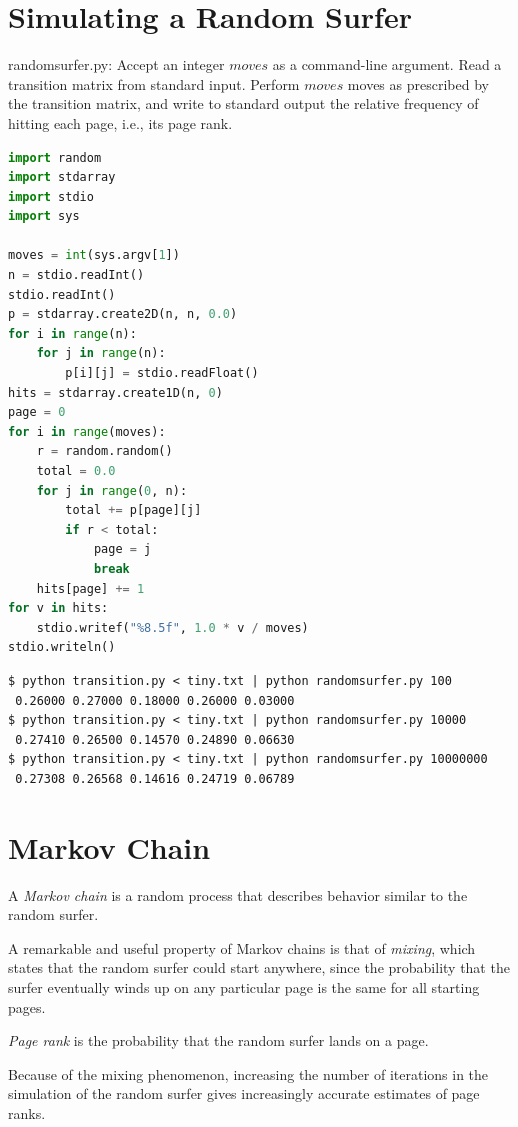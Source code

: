 \documentclass[8pt,a4paper,compress,handout]{beamer}
\begin{document}
\section{Simulating a Random Surfer}
\begin{frame}[fragile]
\begin{framed}
\tiny randomsurfer.py: Accept an integer $moves$ as a command-line argument. Read a transition matrix from standard input. Perform $moves$ moves as prescribed by the transition matrix, and write to standard output the relative frequency of hitting each page, i.e., its page rank.
\end{framed}

\begin{lstlisting}[language=Python]
import random
import stdarray
import stdio
import sys

moves = int(sys.argv[1])
n = stdio.readInt()
stdio.readInt()
p = stdarray.create2D(n, n, 0.0)
for i in range(n):
    for j in range(n):
        p[i][j] = stdio.readFloat()
hits = stdarray.create1D(n, 0)
page = 0
for i in range(moves):
    r = random.random()
    total = 0.0
    for j in range(0, n):
        total += p[page][j]
        if r < total:
            page = j
            break
    hits[page] += 1
for v in hits:
    stdio.writef("%8.5f", 1.0 * v / moves)
stdio.writeln()
\end{lstlisting}
\end{frame}

\begin{frame}[fragile]
\begin{lstlisting}[language={}]
$ python transition.py < tiny.txt | python randomsurfer.py 100
 0.26000 0.27000 0.18000 0.26000 0.03000
$ python transition.py < tiny.txt | python randomsurfer.py 10000
 0.27410 0.26500 0.14570 0.24890 0.06630
$ python transition.py < tiny.txt | python randomsurfer.py 10000000
 0.27308 0.26568 0.14616 0.24719 0.06789
\end{lstlisting}
\end{frame}

\section{Markov Chain}
\begin{frame}[fragile]
A \emph{Markov chain} is a random process that describes behavior similar to the random surfer. 

\bigskip

A remarkable and useful property of Markov chains is that of \emph{mixing}, which states that the random surfer could start anywhere, since the probability that the surfer eventually winds up on any particular page is the same for all starting pages.

\bigskip

\emph{Page rank} is the probability that the random surfer lands on a page. 

\bigskip

Because of the mixing phenomenon, increasing the number of iterations in the simulation of the random surfer gives increasingly accurate estimates of page ranks.
\end{frame}
\end{document}

